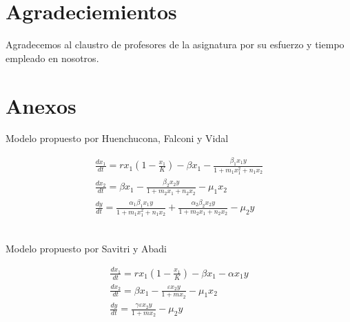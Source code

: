 \documentclass{wscpaperproc}
\theoremstyle{wsc}
\begin{document}
\printbibliography[heading=Referencias, type=article]
\renewcommand{\theenumiv}{}
\printbibliography[heading=Bibliografía, type=book, resetnumbers=true]
\nocite{edwards_differential_2008}
\nocite{upadhyay_introduction_2013}



\section*{Agradeciemientos}
Agradecemos al claustro de profesores de la asignatura por su esfuerzo y tiempo empleado en nosotros.

\appendix

\section{Anexos} \label{app:Anexos}

\begin{center}
	Modelo propuesto por Huenchucona, Falconi y Vidal
	\\
\end{center}

\begin{equation} \label{twoPreyonePredator_Falconi}
	\begin{gathered}
		\frac{d x_1}{d t}=r x_1\left(1-\frac{x_1}{K}\right)-\beta x_1-\frac{\beta_1 x_1 y}{1+m_1 x_1^2+n_1 x_2} \\
		\frac{d x_2}{d t}=\beta x_1-\frac{\beta_2 x_2 y}{1+m_2 x_1+n_2 x_2}-\mu_1 x_2                           \\
		\frac{d y}{d t}=\frac{\alpha_1 \beta_1 x_1 y}{1+m_1 x_1^2+n_1 x_2}+\frac{\alpha_2 \beta_2 x_2 y}{1+m_2 x_1+n_2 x_2}-\mu_2 y
	\end{gathered}
\end{equation}
\\
\begin{center}
	Modelo propuesto por Savitri y Abadi
	\\
\end{center}
\begin{equation} \label{Holling1y2_Abadi}
	\begin{gathered}
		\frac{d x_1}{d t}=r x_1\left(1-\frac{x_1}{K}\right)-\beta x_1-\alpha x_1 y \\
		\frac{d x_2}{d t}=\beta x_1-\frac{\varepsilon x_2 y}{1+m x_2}-\mu_1 x_2 \\
		\frac{d y}{d t}=\frac{\gamma \varepsilon x_2 y}{1+m x_2}-\mu_2 y
	\end{gathered}
\end{equation}
\end{document}
